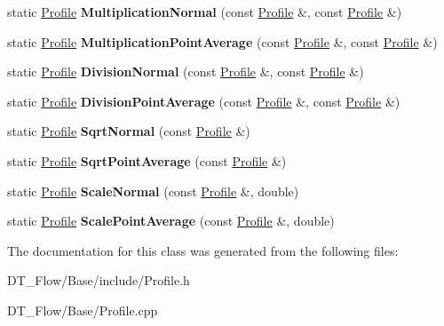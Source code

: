 \begin{DoxyCompactItemize}
\mbox{\label{classQn_1_1Profile_a744c728a961b0c5fa4aeb28a5b1d4c58}} 
static \mbox{\hyperlink{classQn_1_1Profile}{Profile}} {\bfseries Multiplication\+Normal} (const \mbox{\hyperlink{classQn_1_1Profile}{Profile}} \&, const \mbox{\hyperlink{classQn_1_1Profile}{Profile}} \&)
\item 
\mbox{\label{classQn_1_1Profile_a640d37308b7b1dc10d5a9343ffa64049}} 
static \mbox{\hyperlink{classQn_1_1Profile}{Profile}} {\bfseries Multiplication\+Point\+Average} (const \mbox{\hyperlink{classQn_1_1Profile}{Profile}} \&, const \mbox{\hyperlink{classQn_1_1Profile}{Profile}} \&)
\item 
\mbox{\label{classQn_1_1Profile_a1226ec6d8284da2da7e03fd40e7e45bb}} 
static \mbox{\hyperlink{classQn_1_1Profile}{Profile}} {\bfseries Division\+Normal} (const \mbox{\hyperlink{classQn_1_1Profile}{Profile}} \&, const \mbox{\hyperlink{classQn_1_1Profile}{Profile}} \&)
\item 
\mbox{\label{classQn_1_1Profile_a19066a004019297ef7c60ec1d93cea76}} 
static \mbox{\hyperlink{classQn_1_1Profile}{Profile}} {\bfseries Division\+Point\+Average} (const \mbox{\hyperlink{classQn_1_1Profile}{Profile}} \&, const \mbox{\hyperlink{classQn_1_1Profile}{Profile}} \&)
\item 
\mbox{\label{classQn_1_1Profile_a66cfc60e61cc7c32c5e7b6028e0ce9f3}} 
static \mbox{\hyperlink{classQn_1_1Profile}{Profile}} {\bfseries Sqrt\+Normal} (const \mbox{\hyperlink{classQn_1_1Profile}{Profile}} \&)
\item 
\mbox{\label{classQn_1_1Profile_add15aa3e9c72e4dc590f9a95383e2fe5}} 
static \mbox{\hyperlink{classQn_1_1Profile}{Profile}} {\bfseries Sqrt\+Point\+Average} (const \mbox{\hyperlink{classQn_1_1Profile}{Profile}} \&)
\item 
\mbox{\label{classQn_1_1Profile_ada03e1affd51e7e22e40ea73eeb2ce3d}} 
static \mbox{\hyperlink{classQn_1_1Profile}{Profile}} {\bfseries Scale\+Normal} (const \mbox{\hyperlink{classQn_1_1Profile}{Profile}} \&, double)
\item 
\mbox{\label{classQn_1_1Profile_a5374855e471f2dd35c2060249e48f684}} 
static \mbox{\hyperlink{classQn_1_1Profile}{Profile}} {\bfseries Scale\+Point\+Average} (const \mbox{\hyperlink{classQn_1_1Profile}{Profile}} \&, double)
\end{DoxyCompactItemize}


The documentation for this class was generated from the following files\+:\begin{DoxyCompactItemize}
\item 
D\+T\+\_\+\+Flow/\+Base/include/Profile.\+h\item 
D\+T\+\_\+\+Flow/\+Base/Profile.\+cpp\end{DoxyCompactItemize}
